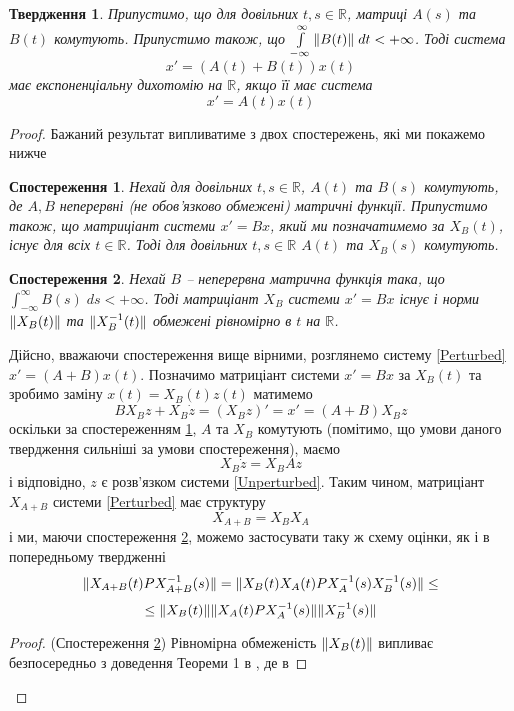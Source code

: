 \documentclass[14pt]{extarticle} %
\newtheorem{observation}{Спостереження}
\newtheorem{proposition}{Твердження}
\theoremstyle{remark}
\begin{document}
\begin{proposition}
	\label{strong}
	Припустимо, що для довільних $t,s\in\mathbb{R}$, матриці $A(s)$ та $B(t)$ комутують.
	Припустимо також, що $\int_{-\infty}^\infty\mynorm{B(t)}\;dt<+\infty$. Тоді система 
	\begin{equation}\label{Perturbed}
	x'=(A(t)+B(t))x(t)
	\end{equation}
	має експоненціальну дихотомію на $\mathbb{R}$, якщо її має система
	\begin{equation}\label{Unperturbed}
	x'=A(t)x(t)
	\end{equation}
\end{proposition}
\begin{proof}
	Бажаний результат випливатиме з двох спостережень, які ми покажемо нижче
	\begin{observation}\label{Hard}Нехай для довільних $t,s\in\mathbb{R}$, $A(t)$ та $B(s)$ комутують, де $A,B$ неперервні
	(не обов’язково обмежені) матричні функції. Припустимо також, що матриціант системи $x'=Bx$, який ми позначатимемо за
	$X_B(t)$, існує для всіх $t\in\mathbb{R}$. Тоді для довільних $t,s\in\mathbb{R}$ $A(t)$ та $X_B(s)$ комутують.\end{observation}
	\begin{observation}\label{Easy}Нехай $B$ -- неперервна матрична функція така, що $\int_{-\infty}^\infty B(s)\;ds<+\infty$. Тоді матриціант
		$X_B$ системи $x'=Bx$ існує і норми $\|X_B(t)\|$ та $\|X^{-1}_B(t)\|$ обмежені рівномірно в $t$ на $\mathbb{R}$.
	\end{observation}
	Дійсно, вважаючи спостереження вище вірними, розглянемо систему \ref{Perturbed} $x'=(A+B)x(t)$. Позначимо матриціант системи $x'=Bx$
	за $X_B(t)$ та зробимо заміну $x(t)=X_B(t)z(t)$ матимемо
	\[BX_Bz+X_B\dot{z}=(X_Bz)'=x'=(A+B)X_Bz\]
	оскільки за спостереженням \ref{Hard}, $A$ та $X_B$ комутують (помітимо, що умови даного твердження сильніші за умови спостереження), маємо
	\[X_B\dot{z}=X_BAz\]
	і відповідно, $z$ є розв’язком системи \ref{Unperturbed}. Таким чином, матриціант $X_{A+B}$ системи \ref{Perturbed}
	має структуру
	\[X_{A+B}=X_BX_A\]
	і ми, маючи спостереження \ref{Easy}, можемо застосувати таку ж схему оцінки, як і в попередньому твердженні
	\[\|X_{A+B}(t)PX^{-1}_{A+B}(s)\|=\|X_B(t)X_A(t)PX^{-1}_A(s)X^{-1}_B(s)\|\leq\]
	\[\leq\|X_B(t)\|\|X_A(t)PX^{-1}_A(s)\|\|X_B^{-1}(s)\|\]
	\begin{proof}{(Спостереження \ref{Easy})} Рівномірна обмеженість $\|X_B(t)\|$
	випливає безпосередньо з доведення Теореми 1 в \cite[\S 12]{demidovich}, де в 

\end{proof}
\end{proof}
\end{document}
